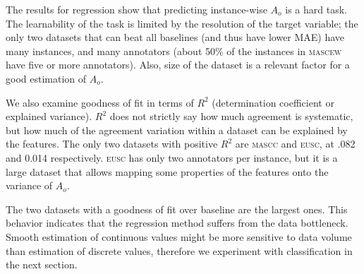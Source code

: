 \documentclass[11pt,a4paper]{article}
\begin{document}
The results for regression show that predicting instance-wise $A_o$ is a hard task. The learnability of the task is limited by the resolution of the target variable; the only two datasets that can beat all baselines (and thus have lower MAE) have many instances, and many annotators (about 50\% of the instances in \textsc{mascew} have five or more annotators). Also, size of the dataset is a relevant factor for a good estimation of $A_o$.

We also examine goodness of fit in terms of $R^2$ (determination coefficient or explained variance). $R^2$ does not strictly say how much agreement is systematic, but how much of the agreement variation within a dataset can be explained by the features. The only two datasets with positive $R^2$ are \textsc{mascc} and \textsc{eusc}, at .082 and 0.014 respectively. \textsc{eusc} has only two annotators per instance, but it is a large dataset that allows mapping some properties of the features onto the variance of $A_o$.

The two datasets with a goodness of fit over baseline are the largest ones. This behavior indicates that the regression method suffers from the data bottleneck. Smooth estimation of continuous values might be more sensitive to data volume than estimation of discrete values, therefore we experiment with classification in the next section.





\end{document}
